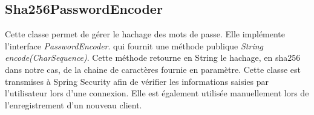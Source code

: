 		\subsection{Sha256PasswordEncoder}
			\label{subsec:Sha256PasswordEncoder}

			Cette classe permet de gérer le hachage des mots de passe. Elle implémente l'interface \textit{PasswordEncoder}. qui fournit une méthode publique \textit{String encode(CharSequence)}. Cette méthode retourne en String le hachage, en sha256 dans notre cas, de la chaine de caractères fournie en paramètre. Cette classe est transmises à Spring Security afin de vérifier les informations saisies par l'utilisateur lors d'une connexion. Elle est également utilisée manuellement lors de l'enregistrement d'un nouveau client.
